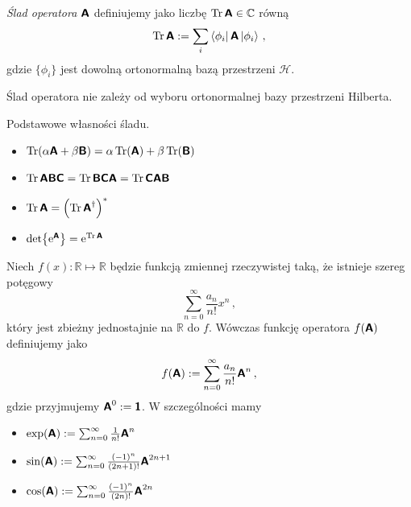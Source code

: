 \documentclass{myclass}
\begin{document}
\begin{definition}
\textit{Ślad operatora \(\boldsymbol{\mathsf{A}}\)} definiujemy jako liczbę \(\Trace \oper{A} \in \mathbb{C}\)
równą
\begin{equation*}
\Trace{\oper{A}} := \sum_{i} \bra{\phi_i}\oper{A}\ket{\phi_i}\,,
\end{equation*}
gdzie \(\{\phi_i\}\) jest dowolną ortonormalną bazą przestrzeni \(\mathscr{H}\).
\end{definition}

\begin{theorem}
Ślad operatora nie zależy od wyboru ortonormalnej bazy przestrzeni Hilberta.    
\end{theorem}

\begin{theorem} Podstawowe własności śladu.
\begin{itemize}
    \item \(\Trace(\alpha\oper{A} + \beta\oper{B}) = \alpha\Trace(\oper{A}) +
    \beta\Trace(\oper{B})\)
    \item \(\Trace{\oper{ABC}} = \Trace{\oper{BCA}} = \Trace{\oper{CAB}}\)
    \item \(\Trace{\oper{A}} = \left(\Trace{\oper{A}^\dagger}\right)^*\)
    \item \(\det{\e^{\oper{A}}} = \e^{\Trace{\oper{A}}}\)
\end{itemize}  
\end{theorem}

\begin{definition}
Niech \(f(x):\mathbb{R}\mapsto\mathbb{R}\) będzie funkcją zmiennej rzeczywistej taką, że istnieje
szereg potęgowy
\begin{equation*}
\sum_{n=0}^\infty\frac{a_n}{n!}x^n\,,
\end{equation*}
który jest zbieżny jednostajnie na \(\mathbb{R}\) do \(f\). Wówczas funkcję operatora
\(f(\boldsymbol{\mathsf{A}})\) definiujemy jako
\begin{equation*}
f(\boldsymbol{\mathsf{A}}) := \sum_{n=0}^\infty \frac{a_n}{n!}\boldsymbol{\mathsf{A}}^n\,,
\end{equation*}
gdzie przyjmujemy \(\boldsymbol{\mathsf{A}}^0 := \boldsymbol{\mathsf{1}}\). W szczególności mamy
\begin{itemize}
    \item \(\exp(\boldsymbol{\mathsf{A}}) := \sum_{n=0}^\infty \frac{1}{n!}\boldsymbol{\mathsf{A}}^n\)

    \item \(\sin(\boldsymbol{\mathsf{A}}) := \sum_{n=0}^\infty \frac{(-1)^n}{(2n+1)!}\boldsymbol{\mathsf{A}}^{2n+1}\)

    \item \(\cos(\boldsymbol{\mathsf{A}}) := \sum_{n=0}^\infty \frac{(-1)^n}{(2n)!}\boldsymbol{\mathsf{A}}^{2n}\)
\end{itemize}
\end{definition}
\end{document}
